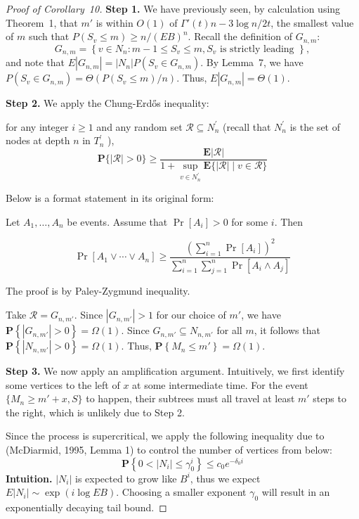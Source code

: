 \begin{proof}[Proof of Corollary~10]
    \textbf{Step 1.} We have previously seen, by calculation using Theorem~1, that $m'$ is within $O(1)$ of $\Gamma'(t) n - 3 \log n / 2t$, the smallest value of $m$ such that $P(S_v \le m) \ge n / (EB)^n$. Recall the definition of $G_{n, m}$:
    \[
G_{n, m}=\left\{v \in N_n: m-1 \leq S_v \leq m, S_v \text { is strictly leading }\right\},
\]
    and note that $E |G_{n, m}| = |N_{n}| P(S_v \in G_{n, m})$. By Lemma~7, we have $P(S_v \in G_{n, m}) = \Theta(P(S_v \le m) / n).$ Thus, $E |G_{n, m}| = \Theta(1)$.

    \textbf{Step 2.} We apply the Chung-Erdős inequality:
    \begin{tcolorbox}[title=Chung-Erdős Inequality,colback=gray!10,colframe=black,breakable]
        for any integer $i \geq 1$ and any random set $\mathcal{R} \subseteq N_n^{\prime}$ (recall that $N_n^{\prime}$ is the set of nodes at depth $n$ in $T_n^{\prime}$ ),
\[
\mathbf{P}\{|\mathcal{R}|>0\} \geq \frac{\mathbf{E}|\mathcal{R}|}{1+\sup _{v \in N_n^{\prime}} \mathbf{E}\{| \mathcal{R} | \mid  v \in \mathcal{R}\}}
\]

    Below is a format statement in its original form:

    Let $A_1, \ldots, A_n$ be events. Assume that $\operatorname{Pr}\left[A_i\right]>0$ for some $i$. Then

    \[
    \operatorname{Pr}\left[A_1 \vee \cdots \vee A_n\right] \geq \frac{\left(\sum_{i=1}^n \operatorname{Pr}\left[A_i\right]\right)^2}{\sum_{i=1}^n \sum_{j=1}^n \operatorname{Pr}\left[A_i \wedge A_j\right]}
    \]

    The proof is by Paley-Zygmund inequality.
\end{tcolorbox}

Take $\mathcal{R} = G_{n, m'}$. Since $|G_{n, m'}| > 1$ for our choice of $m'$, we have $\mathbf{P}\left\{|G_{n, m'}| > 0\right\} = \Omega(1)$. Since $G_{n, m'} \subseteq N_{n, m'}$ for all $m$, it follows that $\mathbf{P}\left\{|N_{n, m'}| > 0\right\} = \Omega(1)$. Thus, $\mathbf{P}\left\{M_n \leq m'\right\} = \Omega(1)$.

\textbf{Step 3.} We now apply an amplification argument. Intuitively, we first identify some vertices to the left of $x$ at some intermediate time. For the event $\{M_n \geq m' + x, S\}$ to happen, their subtrees must all travel at least $m'$ steps to the right, which is unlikely due to Step 2. 

Since the process is supercritical, we apply the following inequality due to (McDiarmid, 1995, Lemma 1) to control the number of vertices from below:
\[
\mathbf{P}\left\{0<\left|N_i\right| \leq \gamma_0^i\right\} \leq c_0 e^{-\delta_0 i}\]
\textbf{Intuition.} $|N_i|$ is expected to grow like $B^i$, thus we expect $E |N_i| \sim \exp(i \log EB)$. Choosing a smaller exponent $\gamma_0$ will result in an exponentially decaying tail bound.


\end{proof}
